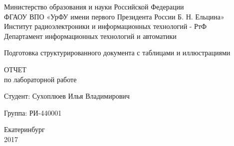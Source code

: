 \begin{titlepage}
  \begin{center}
    Министерство образования и науки Российской Федерации\\
    ФГАОУ ВПО  «УрФУ имени первого Президента России Б. Н. Ельцина»\\
    Институт радиоэлектроники и информационных технологий - РтФ\\
    Департамент информационных технологий и автоматики
    \par
    \vspace{5.5cm}
    \Large{
      Подготовка структурированного документа с таблицами и иллюстрациями
      
      \par
      \vspace{1cm}

      ОТЧЕТ\\
      по лабораторной работе
    }

    \vspace{5cm}
    {
      Студент: \hfill Сухоплюев Илья Владимирович
    }
    \par
    {
      Группа: \hfill РИ-440001
    }

    \par
    \vspace{4cm}
    Екатеринбург\\
    2017
  \end{center}
\end{titlepage}